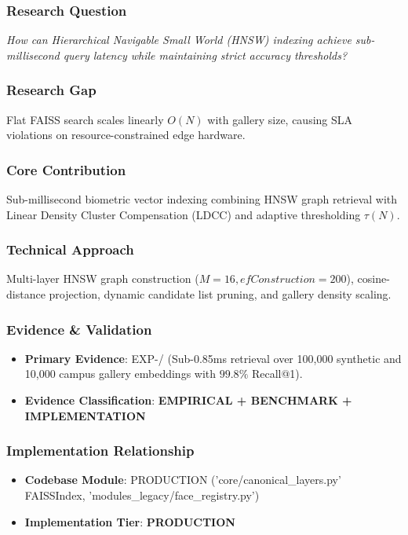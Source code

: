 \documentclass[11pt,letterpaper]{article}
\begin{document}
\subsubsection{Research Question}
\begin{tcolorbox}[colback=blue!3!white,colframe=blue!50!black,title=Primary Scientific Question]
\textit{How can Hierarchical Navigable Small World (HNSW) indexing achieve sub-\allowbreak millisecond query latency while maintaining strict accuracy thresholds?}
\end{tcolorbox}

\subsubsection{Research Gap}
Flat FAISS search scales linearly $O(N)$ with gallery size, causing SLA violations on resource-\allowbreak constrained edge hardware.

\subsubsection{Core Contribution}
Sub-\allowbreak millisecond biometric vector indexing combining HNSW graph retrieval with Linear Density Cluster Compensation (LDCC) and adaptive thresholding $\tau(N)$.

\subsubsection{Technical Approach}
Multi-\allowbreak layer HNSW graph construction ($M=16, efConstruction=200$), cosine-\allowbreak distance projection, dynamic candidate list pruning, and gallery density scaling.

\subsubsection{Evidence \& Validation}
\begin{itemize}[leftmargin=*]
    \item \textbf{Primary Evidence}: EXP-/ (Sub-\allowbreak 0.85ms retrieval over 100,000 synthetic and 10,000 campus gallery embeddings with $99.8\%$ Recall@1).
    \item \textbf{Evidence Classification}: \textbf{EMPIRICAL + BENCHMARK + IMPLEMENTATION}
\end{itemize}

\subsubsection{Implementation Relationship}
\begin{itemize}[leftmargin=*]
    \item \raggedright \textbf{Codebase Module}: PRODUCTION ('core/\allowbreak canonical\_\allowbreak layers.py' FAISSIndex, 'modules\_\allowbreak legacy/\allowbreak face\_\allowbreak registry.py')
    \item \textbf{Implementation Tier}: \textbf{PRODUCTION}
\end{itemize}
\end{document}
